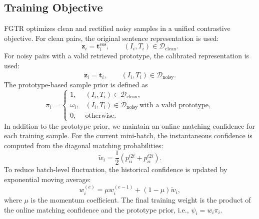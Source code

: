 \subsection{Training Objective}
FGTR optimizes clean and rectified noisy samples in a unified contrastive objective. For clean pairs, the original sentence representation is used:
\begin{equation}
    \boldsymbol{z}_i=\boldsymbol{t}_{i}^{\mathrm{eos}},
    \qquad (I_i,T_i)\in\mathcal{D}_{\mathrm{clean}}.
\end{equation}
For noisy pairs with a valid retrieved prototype, the calibrated representation is used:
\begin{equation}
    \boldsymbol{z}_i=\widehat{\boldsymbol{t}}_i,
    \qquad (I_i,T_i)\in\mathcal{D}_{\mathrm{noisy}}.
\end{equation}
The prototype-based sample prior is defined as
\begin{equation}
    \pi_i=
    \begin{cases}
    1, & (I_i,T_i)\in\mathcal{D}_{\mathrm{clean}},\\
    \omega_i, & (I_i,T_i)\in\mathcal{D}_{\mathrm{noisy}}\ \text{with a valid prototype},\\
    0, & \text{otherwise}.
    \end{cases}
\end{equation}
In addition to the prototype prior, we maintain an online matching confidence for each training sample. For the current mini-batch, the instantaneous confidence is computed from the diagonal matching probabilities:
\begin{equation}
    \widetilde{w}_i
    =
    \frac{1}{2}
    \left(
    p_{ii}^{i2t}+p_{ii}^{t2i}
    \right).
\end{equation}
To reduce batch-level fluctuation, the historical confidence is updated by exponential moving average:
\begin{equation}
    w_i^{(e)}
    =
    \mu w_i^{(e-1)}
    +(1-\mu)\widetilde{w}_i,
\end{equation}
where $\mu$ is the momentum coefficient. The final training weight is the product of the online matching confidence and the prototype prior, i.e., $\psi_i=w_i\pi_i$.

